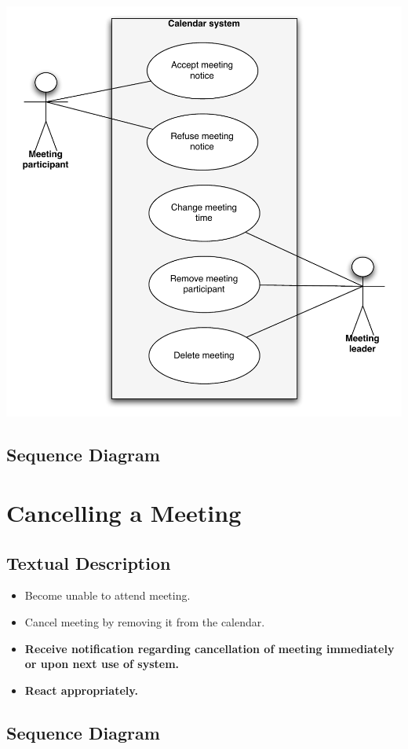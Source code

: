 \documentclass{article}
\begin{document}
\includegraphics[scale=0.9]{UseCase/usecase3FP.pdf}

\subsection{Sequence Diagram}

\section{Cancelling a Meeting}

\subsection{Textual Description}

\begin{itemize}
\item Become unable to attend meeting.

\item Cancel meeting by removing it from the calendar.

\item \textbf{Receive notification regarding cancellation of meeting
immediately or upon next use of system.}

\item \textbf{React appropriately.}
\end{itemize}

\subsection{Sequence Diagram}
\end{document}
